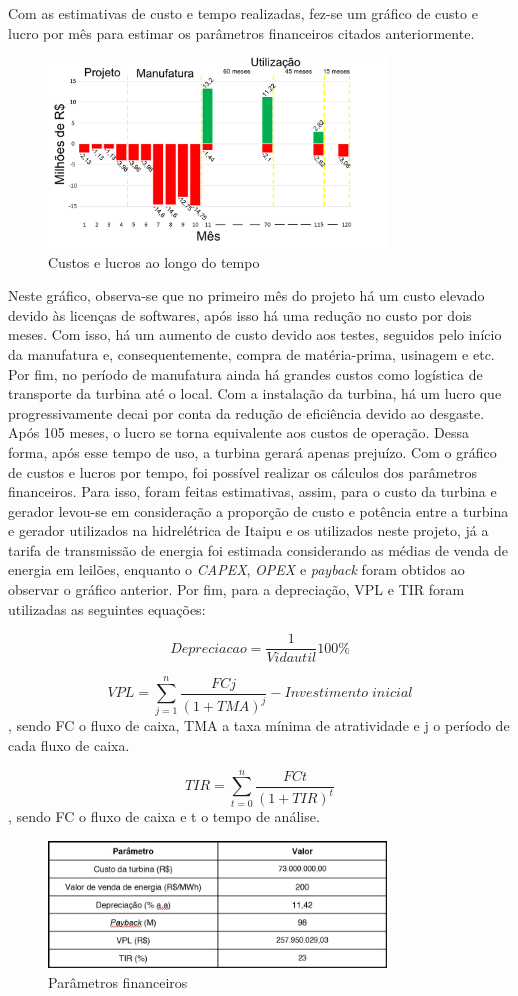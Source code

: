 Com as estimativas de custo e tempo realizadas, fez-se um gráfico de custo e lucro por mês para estimar os parâmetros financeiros citados anteriormente.

\begin{figure}[!ht]
    \centering
    \includegraphics[width=0.8\textwidth]{figuras/img5.png}
    \caption{Custos e lucros ao longo do tempo}
    \label{fig:img5}
\end{figure}

Neste gráfico, observa-se que no primeiro mês do projeto há um custo elevado devido às licenças de softwares, após isso há uma redução no custo por dois meses. Com isso, há um aumento de custo devido aos testes, seguidos pelo início da manufatura e, consequentemente, compra de matéria-prima, usinagem e etc. Por fim, no período de manufatura ainda há grandes custos como logística de transporte da turbina até o local.
Com a instalação da turbina, há um lucro que progressivamente decai por conta da redução de eficiência devido ao desgaste. Após 105 meses, o lucro se torna equivalente aos custos de operação. Dessa forma, após esse tempo de uso, a turbina gerará apenas prejuízo.
Com o gráfico de custos e lucros por tempo, foi possível realizar os cálculos dos parâmetros financeiros. Para isso, foram feitas estimativas, assim, para o custo da turbina e gerador levou-se em consideração a proporção de custo e potência entre a turbina e gerador utilizados na hidrelétrica de Itaipu e os utilizados neste projeto, já a tarifa de transmissão de energia foi estimada considerando as médias de venda de energia em leilões, enquanto o \textit{CAPEX}, \textit{OPEX} e \textit{payback} foram obtidos ao observar o gráfico anterior. Por fim, para a depreciação, VPL e TIR foram utilizadas as seguintes equações:

\[Depreciacao = \dfrac{1}{Vida util}100\%\]

\[ VPL = \sum_{j=1}^{n}\dfrac{FCj}{(1+TMA)^j} - Investimento \; inicial  \], sendo FC o fluxo de caixa, TMA a taxa mínima de atratividade e j o período de cada fluxo de caixa.

\[ TIR = \sum_{t=0}^{n}\dfrac{FCt}{(1+TIR)^t}  \], sendo FC o fluxo de caixa e t o tempo de análise.

\begin{figure}[!h]
    \centering
    \includegraphics[width=0.8\textwidth]{figuras/tabela4.jpeg}
    \caption{Parâmetros financeiros}
    \label{fig:tab4}
\end{figure}
